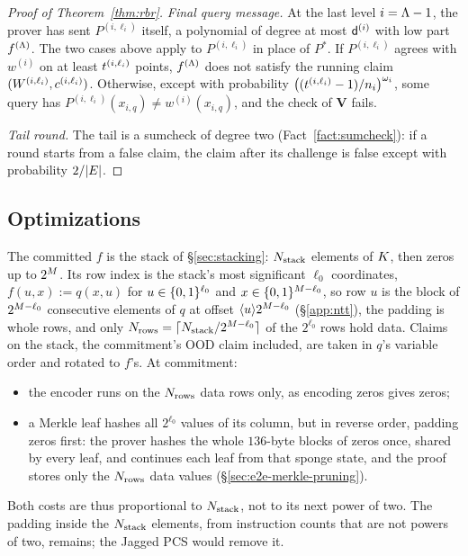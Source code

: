 \begin{proof}[Proof of Theorem~\ref{thm:rbr}]
\medskip\noindent\emph{Final query message.} At the last level $i=\Lambda-1$, the prover has sent $P^{(i,\ell_i)}$ itself, a polynomial of degree at most $\mathsf{d}^{(i)}$ with low part $f^{(\Lambda)}$. The two cases above apply to $P^{(i,\ell_i)}$ in place of $P^\ast$. If $P^{(i,\ell_i)}$ agrees with $w^{(i)}$ on at least $t^{(i,\ell_i)}$ points, $f^{(\Lambda)}$ does not satisfy the running claim $(W^{(i,\ell_i)},c^{(i,\ell_i)})$. Otherwise, except with probability $\bigl((t^{(i,\ell_i)}-1)/n_i\bigr)^{\omega_i}$, some query has $P^{(i,\ell_i)}(x_{i,q})\neq w^{(i)}(x_{i,q})$, and the check of $\mathbf{V}$ fails.

\medskip\noindent\emph{Tail round.} The tail is a sumcheck of degree two (Fact~\ref{fact:sumcheck}): if a round starts from a false claim, the claim after its challenge is false except with probability $2/|E|$.
\end{proof}

\subsection{Optimizations}\label{sec:pcs-opt}

The committed $f$ is the stack of \S\ref{sec:stacking}: $N_{\mathrm{stack}}$ elements of $K$, then zeros up to $2^{M}$. Its row index is the stack's most significant $\ell_0$ coordinates, $f(u, x) := q(x, u)$ for $u \in \{0,1\}^{\ell_0}$ and $x \in \{0,1\}^{M - \ell_0}$, so row $u$ is the block of $2^{M - \ell_0}$ consecutive elements of $q$ at offset $\langle u \rangle 2^{M - \ell_0}$ (\S\ref{app:ntt}), the padding is whole rows, and only $N_{\mathrm{rows}}=\lceil N_{\mathrm{stack}}/2^{M-\ell_0}\rceil$ of the $2^{\ell_0}$ rows hold data. Claims on the stack, the commitment's OOD claim included, are taken in $q$'s variable order and rotated to $f$'s. At commitment:
\begin{itemize}[itemsep=1pt,topsep=2pt]
\item the encoder runs on the $N_{\mathrm{rows}}$ data rows only, as encoding zeros gives zeros;
\item a Merkle leaf hashes all $2^{\ell_0}$ values of its column, but in reverse order, padding zeros first: the prover hashes the whole $136$-byte blocks of zeros once, shared by every leaf, and continues each leaf from that sponge state, and the proof stores only the $N_{\mathrm{rows}}$ data values (\S\ref{sec:e2e-merkle-pruning}).
\end{itemize}
Both costs are thus proportional to $N_{\mathrm{stack}}$, not to its next power of two. The padding inside the $N_{\mathrm{stack}}$ elements, from instruction counts that are not powers of two, remains; the Jagged PCS \cite{jagged_pcs} would remove it.
